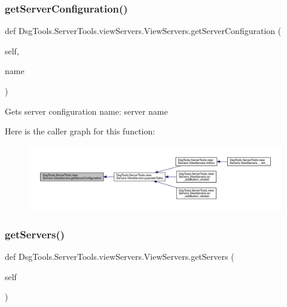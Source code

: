 \subsubsection{\texorpdfstring{get\+Server\+Configuration()}{getServerConfiguration()}}
{\footnotesize\ttfamily def Dsg\+Tools.\+Server\+Tools.\+view\+Servers.\+View\+Servers.\+get\+Server\+Configuration (\begin{DoxyParamCaption}\item[{}]{self,  }\item[{}]{name }\end{DoxyParamCaption})}

\begin{DoxyVerb}Gets server configuration
name: server name 
\end{DoxyVerb}
 Here is the caller graph for this function\+:
\nopagebreak
\begin{figure}[H]
\begin{center}
\leavevmode
\includegraphics[width=350pt]{class_dsg_tools_1_1_server_tools_1_1view_servers_1_1_view_servers_a734c81bf437a09631c00340ab79b3456_icgraph}
\end{center}
\end{figure}
\mbox{\label{class_dsg_tools_1_1_server_tools_1_1view_servers_1_1_view_servers_a5b7b4496925bd02857abb7a4bbf8649b}} 
\subsubsection{\texorpdfstring{get\+Servers()}{getServers()}}
{\footnotesize\ttfamily def Dsg\+Tools.\+Server\+Tools.\+view\+Servers.\+View\+Servers.\+get\+Servers (\begin{DoxyParamCaption}\item[{}]{self }\end{DoxyParamCaption})}


